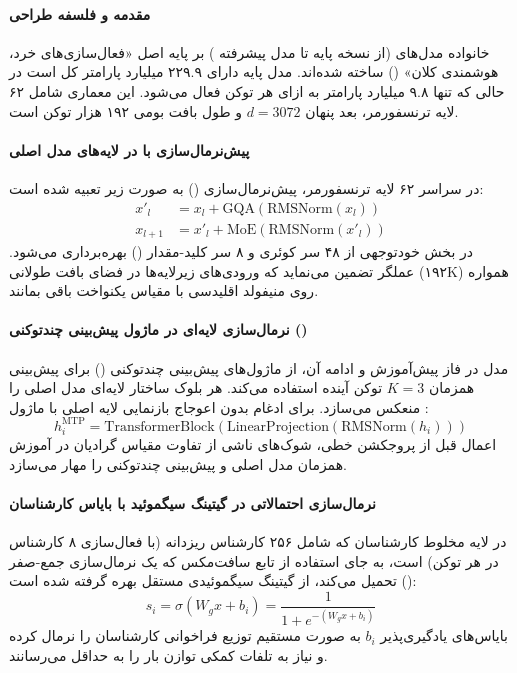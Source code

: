 \item {}

\paragraph*{مقدمه و فلسفه طراحی }
خانواده مدل‌های  \cite{minimax2026m2} (از نسخه پایه تا مدل پیشرفته ) بر پایه اصل «فعال‌سازی‌های خرد، هوشمندی کلان» () ساخته شده‌اند. مدل پایه دارای ۲۲۹.۹ میلیارد پارامتر کل است در حالی که تنها ۹.۸ میلیارد پارامتر به ازای هر توکن فعال می‌شود. این معماری شامل ۶۲ لایه ترنسفورمر، بعد پنهان $d = 3072$ و طول بافت بومی ۱۹۲ هزار توکن است.

\paragraph*{پیش‌نرمال‌سازی با  در لایه‌های مدل اصلی}
در سراسر ۶۲ لایه ترنسفورمر، پیش‌نرمال‌سازی () به صورت زیر تعبیه شده است:
\begin{align}
    x'_l &= x_l + \text{GQA}(\text{RMSNorm}(x_l)) \\
    x_{l+1} &= x'_l + \text{MoE}(\text{RMSNorm}(x'_l))
\end{align}
در بخش خودتوجهی از ۴۸ سر کوئری و ۸ سر کلید-مقدار () بهره‌برداری می‌شود. عملگر  تضمین می‌نماید که ورودی‌های زیرلایه‌ها در فضای بافت طولانی (۱۹۲K) همواره روی منیفولد اقلیدسی با مقیاس یکنواخت باقی بمانند.

\paragraph*{نرمال‌سازی لایه‌ای در ماژول پیش‌بینی چندتوکنی ()}
مدل  در فاز پیش‌آموزش و ادامه آن، از ماژول‌های پیش‌بینی چندتوکنی () برای پیش‌بینی همزمان $K = 3$ توکن آینده استفاده می‌کند. هر بلوک  ساختار لایه‌ای مدل اصلی را منعکس می‌سازد. برای ادغام بدون اعوجاج بازنمایی لایه اصلی با ماژول :
\begin{equation}
    h_i^{\text{MTP}} = \text{TransformerBlock}\left( \text{LinearProjection}(\text{RMSNorm}(h_i)) \right)
\end{equation}
اعمال  قبل از پروجکشن خطی، شوک‌های ناشی از تفاوت مقیاس گرادیان در آموزش همزمان مدل اصلی و پیش‌بینی چندتوکنی را مهار می‌سازد.

\paragraph*{نرمال‌سازی احتمالاتی در گیتینگ سیگموئید با بایاس کارشناسان}
در لایه مخلوط کارشناسان که شامل ۲۵۶ کارشناس ریزدانه (با فعال‌سازی ۸ کارشناس در هر توکن) است، به جای استفاده از تابع سافت‌مکس که یک نرمال‌سازی جمع-صفر () تحمیل می‌کند، از گیتینگ سیگموئیدی مستقل بهره گرفته شده است:
\begin{equation}
    s_i = \sigma(W_g x + b_i) = \frac{1}{1 + e^{-(W_g x + b_i)}}
\end{equation}
بایاس‌های یادگیری‌پذیر $b_i$ به صورت مستقیم توزیع فراخوانی کارشناسان را نرمال کرده و نیاز به تلفات کمکی توازن بار را به حداقل می‌رسانند.

